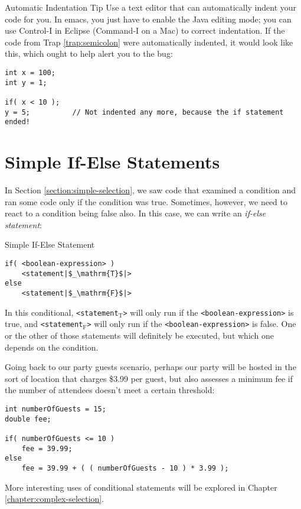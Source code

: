 \begin{tip}{Automatic Indentation Tip}
Use a text editor that can automatically indent your code for you.  In emacs, you just have to enable the Java editing mode; you can use Control-I in Eclipse (Command-I on a Mac) to correct indentation.  If the code from Trap \ref{trap:semicolon} were automatically indented, it would look like this, which ought to help alert you to the bug:

\begin{verbatim}
int x = 100;
int y = 1;

if( x < 10 );
y = 5;          // Not indented any more, because the if statement ended!
\end{verbatim}
\end{tip}

\section{Simple If-Else Statements}
\label{section:ifelse}
In Section \ref{section:simple-selection}, we saw code that examined a condition and ran some code only if the condition was true.  Sometimes, however, we need to react to a condition being false also.  In this case, we can write an \textit{if-else statement}:

\begin{javaformat}{Simple If-Else Statement}
\begin{verbatim}
if( <boolean-expression> )
    <statement|$_\mathrm{T}$|>
else
    <statement|$_\mathrm{F}$|>
\end{verbatim}
\end{javaformat}

In this conditional, \texttt{<statement$_\mathrm{T}$>} will only run if the \texttt{<boolean-expression>} is true, and \texttt{<statement$_\mathrm{F}$>} will only run if the \texttt{<boolean-expression>} is false.  One or the other of those statements will definitely be executed, but which one depends on the condition.

Going back to our party guests scenario, perhaps our party will be hosted in the sort of location that charges \$3.99 per guest, but also assesses a minimum fee if the number of attendees doesn't meet a certain threshold:

\begin{verbatim}
int numberOfGuests = 15;
double fee;

if( numberOfGuests <= 10 )
    fee = 39.99;
else
    fee = 39.99 + ( ( numberOfGuests - 10 ) * 3.99 );
\end{verbatim}

More interesting uses of conditional statements will be explored in Chapter \ref{chapter:complex-selection}.
